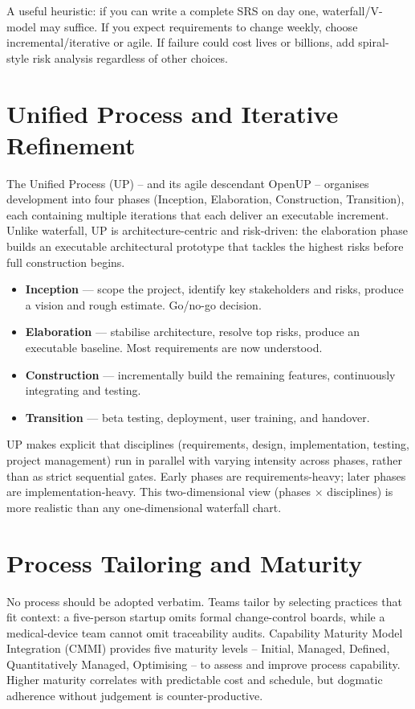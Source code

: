 A useful heuristic: if you can write a complete SRS on day one, waterfall/V-model may suffice. If you expect requirements to change weekly, choose incremental/iterative or agile. If failure could cost lives or billions, add spiral-style risk analysis regardless of other choices.


\section{Unified Process and Iterative Refinement}

The Unified Process (UP) -- and its agile descendant OpenUP -- organises development into four phases (Inception, Elaboration, Construction, Transition), each containing multiple iterations that each deliver an executable increment. Unlike waterfall, UP is architecture-centric and risk-driven: the elaboration phase builds an executable architectural prototype that tackles the highest risks before full construction begins.

\begin{itemize}
    \item \textbf{Inception} --- scope the project, identify key stakeholders and risks, produce a vision and rough estimate. Go/no-go decision.
    \item \textbf{Elaboration} --- stabilise architecture, resolve top risks, produce an executable baseline. Most requirements are now understood.
    \item \textbf{Construction} --- incrementally build the remaining features, continuously integrating and testing.
    \item \textbf{Transition} --- beta testing, deployment, user training, and handover.
\end{itemize}

UP makes explicit that disciplines (requirements, design, implementation, testing, project management) run in parallel with varying intensity across phases, rather than as strict sequential gates. Early phases are requirements-heavy; later phases are implementation-heavy. This two-dimensional view (phases $\times$ disciplines) is more realistic than any one-dimensional waterfall chart.

\section{Process Tailoring and Maturity}

No process should be adopted verbatim. Teams tailor by selecting practices that fit context: a five-person startup omits formal change-control boards, while a medical-device team cannot omit traceability audits. Capability Maturity Model Integration (CMMI) provides five maturity levels -- Initial, Managed, Defined, Quantitatively Managed, Optimising -- to assess and improve process capability. Higher maturity correlates with predictable cost and schedule, but dogmatic adherence without judgement is counter-productive.


